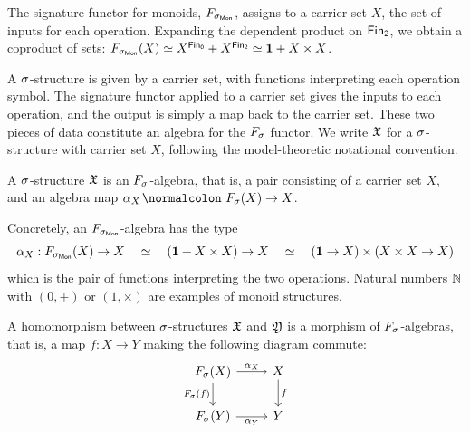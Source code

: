\begin{example}
    The signature functor for monoids, $\SigMon$, assigns to a carrier set $X$,
    the set of inputs for each operation.
    Expanding the dependent product on $\Fin[2]$, we obtain a coproduct of sets:
    $\SigMon(X) \eqv X^{\Fin[0]} + X^{\Fin[2]} \eqv \unitt + X \times X$.
\end{example}
%
A $\sigma$-structure is given by a carrier set, with functions interpreting each operation symbol.
%
The signature functor applied to a carrier set gives the inputs to each operation,
and the output is simply a map back to the carrier set.
%
These two pieces of data constitute an algebra for the $\Sig$ functor.
%
We write $\mathfrak{X}$ for a $\sigma$-structure with carrier set $X$, following the model-theoretic notational convention.

\begin{definition}
    \label{algebra:struct}
    A $\sigma$-structure $\mathfrak{X}$ is an $\Sig$-algebra, that is, a pair consisting of
    a carrier set $X$, and
    an algebra map $\alpha_{X}\colon \Sig(X) \to X$.
\end{definition}

\begin{example}
    Concretely, an $\SigMon$-algebra has the type
    \[
        \alpha_{X} : \SigMon(X) \to X
        \quad\eqv\quad
        (\unitt + X \times X) \to X
        \quad\eqv\quad
        (\unitt \to X) \times (X \times X \to X)
    \]
    which is the pair of functions interpreting the two operations.
    Natural numbers $\mathbb{N}$ with $(0, +)$ or $(1, \times)$ are examples of monoid structures.
\end{example}

\begin{definition}
    A homomorphism between $\sigma$-structures $\mathfrak{X}$ and $\mathfrak{Y}$ is a morphism of $\Sig$-algebras,
    that is, a map $f : X \to Y$ making the following diagram commute:
    \[
        \begin{tikzcd}
            \Sig(X) \arrow[r, "\alpha_{X}"] \arrow[d, "\Sig(f)"']
            & X \arrow[d, "f"] \\
            \Sig(Y) \arrow[r, "\alpha_{Y}"']
            & Y
        \end{tikzcd}
    \]
\end{definition}

